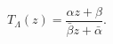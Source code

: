\begin{equation}
T_{\Lambda}(z)=\frac{\alpha z+\beta}{\bar{\beta} z+\bar{\alpha}}.
\label{z'z}
\end{equation}

